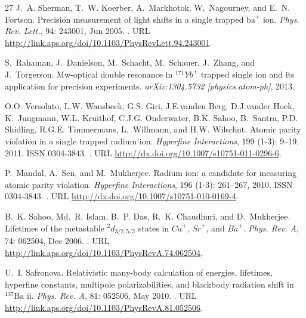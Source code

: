 \documentclass[%
 reprint,
 amsmath,amssymb,
 aps,
]{revtex4-1}
\begin{document}
\begin{thebibliography}{27}
J.~A. Sherman, T.~W. Koerber, A.~Markhotok, W.~Nagourney, and E.~N. Fortson.
\newblock Precision measurement of light shifts in a single trapped
  ${\mathrm{ba}}^{+}$ ion.
\newblock \emph{Phys. Rev. Lett.}, 94: 243001, Jun 2005.
\newblock {}.
\newblock URL \url{http://link.aps.org/doi/10.1103/PhysRevLett.94.243001}.

S.~Rahaman, J.~Danielson, M.~Schacht, M.~Schauer, J.~Zhang, and J.~Torgerson.
\newblock Mw-optical double resonance in $^{171}{Yb}^+$ trapped single ion and
  its application for precision experiments.
\newblock \emph{arXiv:1304.5732 [physics.atom-ph]}, 2013.

O.O. Versolato, L.W. Wansbeek, G.S. Giri, J.E.vanden Berg, D.J.vander Hoek,
  K.~Jungmann, W.L. Kruithof, C.J.G. Onderwater, B.K. Sahoo, B.~Santra, P.D.
  Shidling, R.G.E. Timmermans, L.~Willmann, and H.W. Wilschut.
\newblock Atomic parity violation in a single trapped radium ion.
\newblock \emph{Hyperfine Interactions}, 199 (1-3): 9--19,
  2011.
\newblock ISSN 0304-3843.
\newblock {}.
\newblock URL \url{http://dx.doi.org/10.1007/s10751-011-0296-6}.

P.~Mandal, A.~Sen, and M.~Mukherjee.
\newblock Radium ion: a candidate for measuring atomic parity violation.
\newblock \emph{Hyperfine Interactions}, 196 (1-3): 261--267,
  2010.
\newblock ISSN 0304-3843.
\newblock {}.
\newblock URL \url{http://dx.doi.org/10.1007/s10751-010-0169-4}.

B.~K. Sahoo, Md.~R. Islam, B.~P. Das, R.~K. Chaudhuri, and D.~Mukherjee.
\newblock Lifetimes of the metastable $^{2}d_{3/2,5/2}$ states in ${Ca}^{+}$,
  ${Sr}^{+}$, and ${Ba}^{+}$.
\newblock \emph{Phys. Rev. A}, 74: 062504, Dec 2006.
\newblock {}.
\newblock URL \url{http://link.aps.org/doi/10.1103/PhysRevA.74.062504}.

U.~I. Safronova.
\newblock Relativistic many-body calculation of energies, lifetimes, hyperfine
  constants, multipole polarizabilities, and blackbody radiation shift in
  $^{137}\mathrm{Ba}$ ii.
\newblock \emph{Phys. Rev. A}, 81: 052506, May 2010.
\newblock {}.
\newblock URL \url{http://link.aps.org/doi/10.1103/PhysRevA.81.052506}.


\end{thebibliography}
\end{document}
